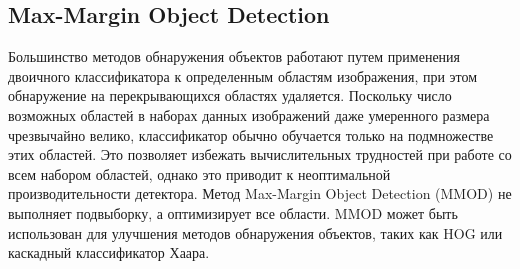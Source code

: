 \documentclass[14pt]{matmex-diploma-custom}
\begin{document}
    \subsection{Max-Margin Object Detection} 
    Большинство методов обнаружения объектов работают путем применения
    двоичного классификатора к определенным областям изображения, при этом обнаружение на перекрывающихся областях удаляется. Поскольку число возможных областей в наборах данных
    изображений даже умеренного размера чрезвычайно велико, классификатор
    обычно обучается только на подмножестве этих областей. Это позволяет избежать
    вычислительных трудностей при работе со всем набором областей, однако это приводит к неоптимальной производительности детектора.
    Метод Max-Margin Object Detection (MMOD) \cite{mmod} не выполняет подвыборку, а
    оптимизирует все области. MMOD может быть использован для улучшения
    методов обнаружения объектов, таких как HOG или каскадный классификатор Хаара.
    
    
\end{document}
